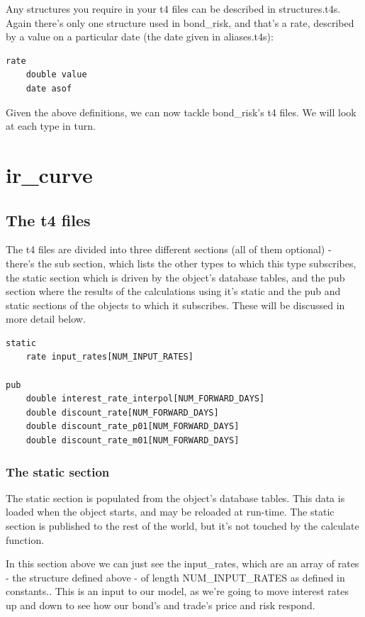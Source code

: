 \documentclass{report}
\begin{document}
Any structures you require in your t4 files can be described in structures.t4s. Again there's only one structure used in bond_risk, and that's a rate, described by a value on a particular date (the date given in aliases.t4s):

\begin{verbatim}
rate
    double value
    date asof
\end{verbatim}

Given the above definitions, we can now tackle bond_risk's t4 files. We will look at each type in turn.

\section{ir_curve}

\subsection{The t4 files}

The t4 files are divided into three different sections (all of them optional) - there's the sub section, which lists the other types to which this type subscribes, the static section which is driven by the object's database tables, and the pub section where the results of the calculations using it's static and the pub and static sections of the objects to which it subscribes. These will be discussed in more detail below.

\begin{verbatim}
static
    rate input_rates[NUM_INPUT_RATES]

pub
    double interest_rate_interpol[NUM_FORWARD_DAYS]
    double discount_rate[NUM_FORWARD_DAYS]
    double discount_rate_p01[NUM_FORWARD_DAYS]
    double discount_rate_m01[NUM_FORWARD_DAYS]
\end{verbatim}

\subsubsection{The static section}

The static section is populated from the object's database tables. This data is loaded when the object starts, and may be reloaded at run-time. The static section is published to the rest of the world, but it's not touched by the calculate function.

In this section above we can just see the input_rates, which are an array of rates - the structure defined above - of length NUM_INPUT_RATES as defined in constants.. This is an input to our model, as we're going to move interest rates up and down to see how our bond's and trade's price and risk respond. 
\end{document}
